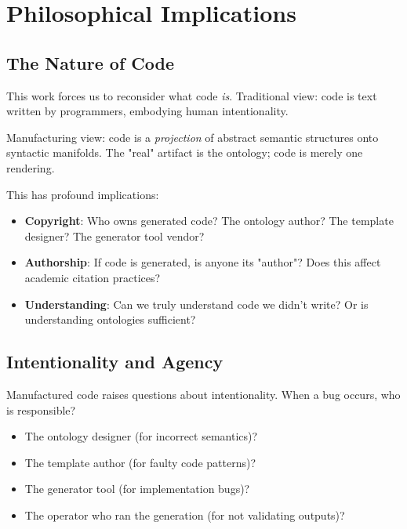 \section{Philosophical Implications}

\subsection{The Nature of Code}

This work forces us to reconsider what code \textit{is}. Traditional view: code is text written by programmers, embodying human intentionality.

Manufacturing view: code is a \textit{projection} of abstract semantic structures onto syntactic manifolds. The "real" artifact is the ontology; code is merely one rendering.

This has profound implications:

\begin{itemize}
    \item \textbf{Copyright}: Who owns generated code? The ontology author? The template designer? The generator tool vendor?

    \item \textbf{Authorship}: If code is generated, is anyone its "author"? Does this affect academic citation practices?

    \item \textbf{Understanding}: Can we truly understand code we didn't write? Or is understanding ontologies sufficient?
\end{itemize}

\subsection{Intentionality and Agency}

Manufactured code raises questions about intentionality. When a bug occurs, who is responsible?

\begin{itemize}
    \item The ontology designer (for incorrect semantics)?
    \item The template author (for faulty code patterns)?
    \item The generator tool (for implementation bugs)?
    \item The operator who ran the generation (for not validating outputs)?
\end{itemize}

